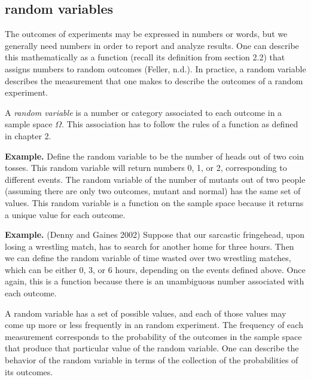 \documentclass[
  letterpaper,
  DIV=11,
  numbers=noendperiod]{scrreprt}
\begin{document}
\hypertarget{random-variables}{%
\subsection{random variables}\label{random-variables}}

The outcomes of experiments may be expressed in numbers or words, but we
generally need numbers in order to report and analyze results. One can
describe this mathematically as a function (recall its definition from
section 2.2) that assigns numbers to random outcomes (Feller, n.d.). In
practice, a random variable describes the measurement that one makes to
describe the outcomes of a random experiment.

\begin{tcolorbox}[enhanced jigsaw, arc=.35mm, colframe=quarto-callout-note-color-frame, left=2mm, opacitybacktitle=0.6, breakable, title=\textcolor{quarto-callout-note-color}{\faInfo}\hspace{0.5em}{Definition}, toprule=.15mm, coltitle=black, bottomtitle=1mm, toptitle=1mm, colback=white, leftrule=.75mm, colbacktitle=quarto-callout-note-color!10!white, titlerule=0mm, opacityback=0, rightrule=.15mm, bottomrule=.15mm]

A \emph{random variable} is a number or category associated to each
outcome in a sample space \(\Omega\). This association has to follow the
rules of a function as defined in chapter 2.

\end{tcolorbox}

\textbf{Example.} Define the random variable to be the number of heads
out of two coin tosses. This random variable will return numbers 0, 1,
or 2, corresponding to different events. The random variable of the
number of mutants out of two people (assuming there are only two
outcomes, mutant and normal) has the same set of values. This random
variable is a function on the sample space because it returns a unique
value for each outcome.

\textbf{Example.} (Denny and Gaines 2002) Suppose that our sarcastic
fringehead, upon losing a wrestling match, has to search for another
home for three hours. Then we can define the random variable of time
wasted over two wrestling matches, which can be either 0, 3, or 6 hours,
depending on the events defined above. Once again, this is a function
because there is an unambiguous number associated with each outcome.

A random variable has a set of possible values, and each of those values
may come up more or less frequently in an random experiment. The
frequency of each measurement corresponds to the probability of the
outcomes in the sample space that produce that particular value of the
random variable. One can describe the behavior of the random variable in
terms of the collection of the probabilities of its outcomes.
\end{document}
